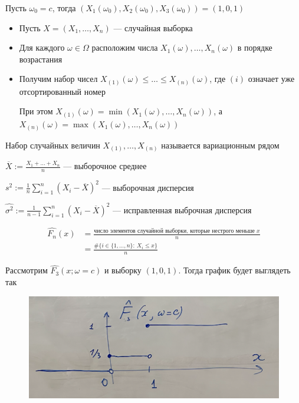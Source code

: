 \documentclass[a4paper, 10pt]{article}
\begin{document}
Пусть $\omega_0=c$, тогда $\left(X_1(\omega_0),X_2(\omega_0),X_3(\omega_0)\right)=(1,0,1)$

\begin{itemize}
    \item Пусть $X=(X_1,\ldots,X_n)$ — случайная выборка
    \item Для каждого $\omega\in\Omega$ расположим числа $X_1(\omega),\ldots,X_n(\omega)$ в порядке возрастания
    \item Получим набор чисел $X_{(1)}(\omega)\leqslant\ldots\leqslant X_{(n)}(\omega)$, где $(i)$ означает уже отсортированный номер
    
    При этом $X_{(1)}(\omega)=\min(X_1(\omega),\ldots,X_n(\omega))$, а $X_{(n)}(\omega)=\max(X_1(\omega),\ldots,X_n(\omega))$
\end{itemize}

 Набор случайных величин $X_{(1)},\ldots,X_{(n)}$ называется вариационным рядом

 $\overline{X}:=\displaystyle\frac{X_1+\ldots+X_n}{n}$ — выборочное среднее

 $s^2:=\displaystyle\frac{1}{n}\sum_{i=1}^n (X_i-\overline{X})^2$ — выборочная дисперсия

 $\hat{\sigma^2}:=\displaystyle\frac{1}{n-1}\sum_{i=1}^n (X_i-\overline{X})^2$ — исправленная выброчная дисперсия

 \begin{equation*}
    \begin{aligned}
        \hat{F_n}(x)&=\displaystyle\frac{\text{число элементов случайной выборки, которые нестрого меньше } x}{n}\\
        &=\frac{\#\{i\in\{1,\ldots,n\}:\ X_i\leqslant x\}}{n}
    \end{aligned}
\end{equation*}

\ex Рассмотрим $\hat{F_3}(x;\omega=c)$ и выборку $(1,0,1)$. Тогда график будет выглядеть так

\begin{figure}[h]
    \centering
    \includegraphics[width=0.6\linewidth]{intro-to-stat.png}
\end{figure}
\end{document}
